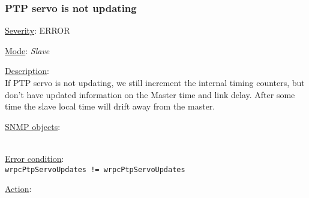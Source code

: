 \subsubsection{\bf PTP servo is not updating}
		\label{fail:timing:servo_not_updating}
		\begin{pck_descr}
			\item [] \underline{Severity}: ERROR
			\item [] \underline{Mode}: \emph{Slave}
			\item [] \underline{Description}:\\
				If PTP servo is not updating, we still increment the internal timing
				counters, but don't have updated information on the Master time and link
				delay. After some time the slave local time will drift away from the
				master.
			\item [] \underline{SNMP objects}:\\
				{\footnotesize
				\\
				 }
			\item [] \underline{Error condition}:\\
				{\footnotesize
				\texttt{wrpcPtpServoUpdates != wrpcPtpServoUpdates} }
      \item [] \underline{Action}:\\
		\end{pck_descr}

